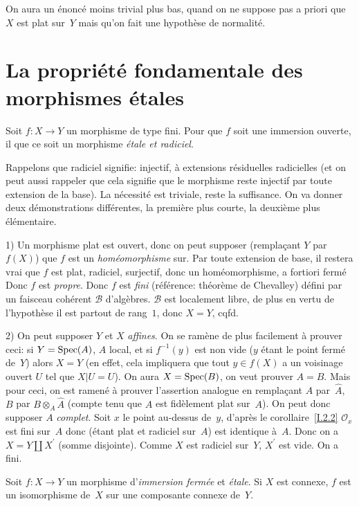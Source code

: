 \begin{remarquestar}
On
aura un \'enonc\'e moins trivial plus bas, quand on ne suppose
pas a priori que $X$ est plat sur~$Y$ mais qu'on fait une
hypoth\`ese de normalit\'e.
\end{remarquestar}

\section{La propri\'et\'e fondamentale des morphismes \'etales}
\label{I.5}

\begin{theoreme}
\label{I.5.1}
Soit $f\colon X \to Y$ un morphisme de type fini. Pour que $f$ soit
une immersion ouverte, il \fets que ce soit un
morphisme \emph{étale et radiciel}.
\end{theoreme}

Rappelons que radiciel
signifie: injectif, \`a extensions
r\'esiduelles radicielles (et
on
peut aussi rappeler que cela signifie que le morphisme reste injectif
par toute extension de la base). La n\'ecessit\'e est triviale,
reste la suffisance. On va donner deux d\'emonstrations
diff\'erentes, la premi\`ere plus courte, la deuxi\`eme plus
\'el\'ementaire.

1) Un morphisme plat est ouvert, donc on peut supposer (rempla\c cant $Y$ par~$f(X)$) que $f$ est un \emph{homéomorphisme}
sur.
Par toute extension de base, il restera vrai que
$f$
est plat, radiciel, surjectif, donc un hom\'eomorphisme, a fortiori
ferm\'e
Donc $f$ est \emph{propre}. Donc $f$ est \emph{fini}
(r\'ef\'erence: th\'eor\`eme de Chevalley) d\'efini par un
faisceau coh\'erent $\mathcal{B}$ d'alg\`ebres. $\mathcal{B}$ est
localement libre, de plus en vertu de l'hypoth\`ese il est partout
de rang~$1$, donc $X=Y$, cqfd.

2) On peut supposer $Y$ et $X$ \emph{affines}. On se ram\`ene de
plus facilement \`a prouver ceci: si $Y = \operatorname{Spec}(A)$, $A$ local, et
si $f^{-1}(y)$ est non vide ($y$ \'etant le point ferm\'e de~$Y$)
alors $X=Y$ (en effet, cela impliquera que tout $y \in f(X)$ a un
voisinage ouvert $U$ tel que $X|U = U$). On aura $X = \operatorname{Spec}(B)$, on
veut prouver $A=B$. Mais pour ceci, on est ramen\'e \`a prouver
l'assertion analogue en rempla\c cant $A$ par~$\hat A$, $B$ par $B
\otimes_A \hat A$ (compte tenu que $\hat A$ est fid\`element plat
sur~$A$). On peut donc supposer $A$ \emph{complet}. Soit $x$ le point
au-dessus de~$y$, d'apr\`es le corollaire~\ref{I.2.2}
$\mathcal{O}_x$ est fini sur~$A$ donc (\'etant plat et radiciel
sur~$A$) est identique \`a~$A$. Donc on a $X = Y \amalg X^\prime$
(somme disjointe). Comme $X$ est radiciel sur~$Y$, $X^\prime$ est
vide. On a fini.
\enlargethispage{.5cm}\begin{corollaire}
\label{I.5.2}
Soit $f\colon X \to Y$ un morphisme d'\emph{immersion fermée} et
\emph{étale}. Si $X$ est connexe, $f$ est un isomorphisme de~$X$
sur une composante connexe de~$Y$.
\end{corollaire}

